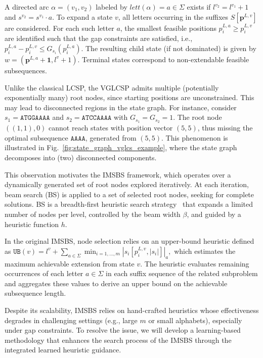 \documentclass[runningheads]{llncs}
\begin{document}
A directed arc $\alpha=(v_1, v_2)$ labeled by $lett(\alpha)=a \in \Sigma$ exists if $l^{v_2}=l^{v_1}+1$ and $s^{v_2}=s^{v_1}\cdot a$. To expand a state $v$, all letters occurring in the suffixes $S[\mathbf{p}^{L,v}]$ are considered. For each such letter $a$, the smallest feasible positions $p^{L,a}_i \geq p^{L,v}_i$ are identified such that the gap constraints are satisfied, i.e., $p^{L,a}_i - p^{L,v}_i \leq G_{s_i}(p^{L,a}_i)$. The resulting child state (if not dominated) is given by $w=(\mathbf{p}^{L,a}+\mathbf{1}, l^v+1)$. Terminal states correspond to non-extendable feasible subsequences.

Unlike the classical LCSP, the VGLCSP admits multiple (potentially exponentially many) root nodes, since starting positions are unconstrained. This may lead to disconnected regions in the state graph. For instance, consider $s_1=\texttt{ATGGAAAA}$ and $s_2=\texttt{ATCCAAAA}$ with $G_{s_1}=G_{s_2}=1$. The root node $((1,1),0)$ cannot reach states with position vector $(5,5)$, thus missing the optimal subsequence $\texttt{AAAA}$, generated from $(5,5)$. This phenomenon is illustrated in Fig.~\ref{fig:state_graph_vglcs_example}, where the state graph decomposes into (two) disconnected components.

This observation motivates the IMSBS framework, which operates over a dynamically generated set of root nodes explored iteratively. At each iteration, beam search (BS) is applied to a set of selected root nodes, seeking for complete solutions. BS is a breadth-first heuristic search strategy~\cite{wiseman2016sequence} that expands a limited number of nodes per level, controlled by the beam width $\beta$, and guided by a heuristic function $h$.

In the original IMSBS, node selection relies on an upper-bound heuristic defined as $
\texttt{UB}(v)= l^v + \sum_{a \in \Sigma} \min_{i=1,\ldots,m} |s_i[p^{L,v}_i, |s_i|]|_a,$ 
which estimates the maximum achievable extension from state $v$. The heuristic evaluates remaining occurrences of each letter $a\in\Sigma$ in each suffix sequence of the related subproblem and aggregates these values to derive an upper bound on the achievable subsequence length.

Despite its scalability, IMSBS relies on hand-crafted heuristics whose effectiveness degrades in challenging settings (e.g., large $m$ or small alphabets), especially under gap constraints. {To resolve the issue, we will develop a learning-based methodology that enhances the search process of the IMSBS through the integrated learned heuristic guidance. }
 
\end{document}
